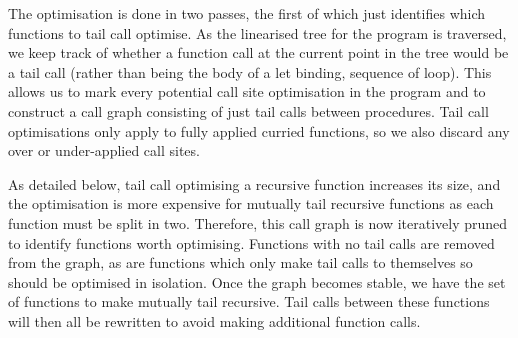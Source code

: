 The optimisation is done in two passes, the first of which just identifies which functions to tail call optimise. As the linearised tree for the program is traversed, we keep track of whether a function call at the current point in the tree would be a tail call (rather than being the body of a let binding, sequence of loop).
This allows us to mark every potential call site optimisation in the program and to construct a call graph consisting of just tail calls between procedures. Tail call optimisations only apply to fully applied curried functions, so we also discard any over or under-applied call sites.

As detailed below, tail call optimising a recursive function increases its size, and the optimisation is more expensive for mutually tail recursive functions as each function must be split in two. Therefore, this call graph is now iteratively pruned to identify functions worth optimising. Functions with no tail calls are removed from the graph, as are functions which only make tail calls to themselves so should be optimised in isolation. Once the graph becomes stable, we have the set of functions to make mutually tail recursive. Tail calls between these functions will then all be rewritten to avoid making additional function calls.

